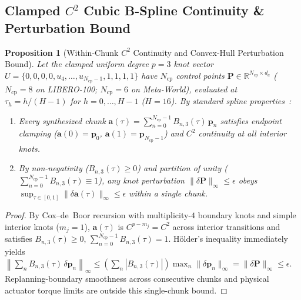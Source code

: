 \documentclass[10pt]{article}
\newtheorem{proposition}{Proposition}
\begin{document}
\subsection{Clamped \texorpdfstring{$C^2$}{C2} Cubic B-Spline Continuity \& Perturbation Bound}
\begin{proposition}[Within-Chunk $C^2$ Continuity and Convex-Hull Perturbation Bound]
\label{prop:bspline}
Let the clamped uniform degree $p=3$ knot vector $U = \{0, 0, 0, 0, u_4, \dots, u_{N_{\text{cp}}-1}, 1, 1, 1, 1\}$ have $N_{\text{cp}}$ control points $\mathbf{P} \in \mathbb{R}^{N_{\text{cp}} \times d_a}$ ($N_{\text{cp}}=8$ on LIBERO-100; $N_{\text{cp}}=6$ on Meta-World), evaluated at $\tau_h = h / (H-1)$ for $h = 0, \dots, H-1$ ($H=16$). By standard spline properties~\cite{deboor1978splines,piegl1997nurbs}:
\begin{enumerate}[leftmargin=*,itemsep=2pt]
  \item Every synthesized chunk $\mathbf{a}(\tau) = \sum_{n=0}^{N_{\text{cp}}-1} B_{n,3}(\tau)\,\mathbf{p}_n$ satisfies endpoint clamping ($\mathbf{a}(0) = \mathbf{p}_0$, $\mathbf{a}(1) = \mathbf{p}_{N_{\text{cp}}-1}$) and $C^2$ continuity at all interior knots.
  \item By non-negativity ($B_{n,3}(\tau) \ge 0$) and partition of unity ($\sum_{n=0}^{N_{\text{cp}}-1} B_{n,3}(\tau) \equiv 1$), any knot perturbation $\|\delta\mathbf{P}\|_\infty \le \epsilon$ obeys $\sup_{\tau \in [0,1]} \|\delta\mathbf{a}(\tau)\|_\infty \le \epsilon$ within a single chunk.
\end{enumerate}
\end{proposition}

\begin{proof}
By Cox--de~Boor recursion with multiplicity-$4$ boundary knots and simple interior knots ($m_j=1$), $\mathbf{a}(\tau)$ is $C^{p-m_j}=C^2$ across interior transitions and satisfies $B_{n,3}(\tau) \ge 0$, $\sum_{n=0}^{N_{\text{cp}}-1} B_{n,3}(\tau) = 1$. H\"older's inequality immediately yields $\left\| \sum_{n} B_{n,3}(\tau)\, \delta\mathbf{p}_n \right\|_\infty \le (\sum_n |B_{n,3}(\tau)|)\max_n \|\delta\mathbf{p}_n\|_\infty = \|\delta\mathbf{P}\|_\infty \le \epsilon$. Replanning-boundary smoothness across consecutive chunks and physical actuator torque limits are outside this single-chunk bound.
\end{proof}
\end{document}
